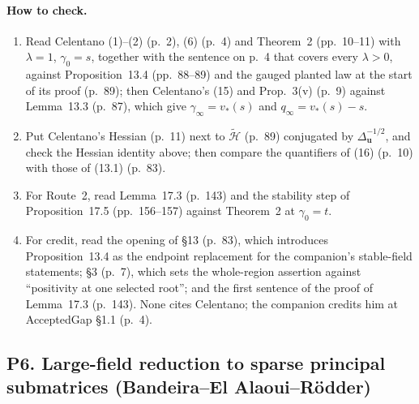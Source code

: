 \documentclass[11pt]{article}
\newcommand{\ploc}[2]{#1}
\begin{document}
\paragraph{How to check.}
\begin{enumerate}
\item Read Celentano (1)--(2) (p.~2), (6) (p.~4) and Theorem~2 (pp.~10--11)
 with $\lambda=1$, $\gamma_0=s$, together with the sentence on p.~4 that
 covers every $\lambda>0$, against
 \ploc{Proposition~13.4 (pp.~88--89)}{profile-positive.tex:442--466} and the
 gauged planted law at the start of its proof
 \ploc{(p.~89)}{profile-positive.tex:475--483}; then Celentano's (15) and
 Prop.~3(v) (p.~9) against
 \ploc{Lemma~13.3 (p.~87)}{profile-positive.tex:311--328}, which give
 $\gamma_\infty=v_*(s)$ and $q_\infty=v_*(s)-s$.
\item Put Celentano's Hessian (p.~11) next to $\widetilde{\mathcal H}$
 \ploc{(p.~89)}{profile-positive.tex:479--483} conjugated by
 $\Delta_{\mathbf u}^{-1/2}$, and check the Hessian identity above; then compare
 the quantifiers of (16) (p.~10) with those of
 \ploc{(13.1) (p.~83)}{profile-positive.tex:22--30}.
\item For Route~2, read
 \ploc{Lemma~17.3 (p.~143)}{cap-classical.tex:298--314} and the stability step
 of \ploc{Proposition~17.5 (pp.~156--157)}{cap-classical.tex:1308--1375}
 against Theorem~2 at $\gamma_0=t$.
\item For credit, read the opening of
 \ploc{\S13 (p.~83)}{profile-positive.tex:33--39}, which introduces
 Proposition~13.4 as the endpoint replacement for the companion's
 stable-field statements; \ploc{\S3 (p.~7)}{accepted-inputs.tex:24--30}, which
 sets the whole-region assertion against ``positivity at one selected root'';
 and the first sentence of the proof of
 \ploc{Lemma~17.3 (p.~143)}{cap-classical.tex:316--318}. None cites
 Celentano; the companion credits him at
 \ploc{AcceptedGap \S1.1 (p.~4)}{introduction.tex:118--125}.
\end{enumerate}
\subsection{P6. Large-field reduction to sparse principal submatrices (Bandeira--El Alaoui--R\"odder)}\label{f:P6}
\end{document}
